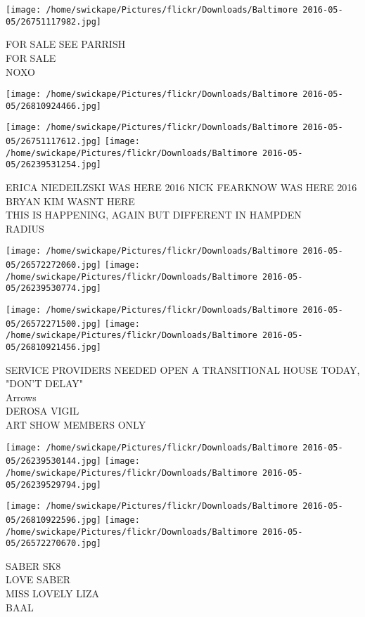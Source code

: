 \documentclass[10pt,letterpaper]{article}
\begin{document}
\texttt{[image: /home/swickape/Pictures/flickr/Downloads/Baltimore 2016-05-05/26751117982.jpg]}

FOR SALE SEE PARRISH\\
FOR SALE\\
NOXO
\pagebreak

\texttt{[image: /home/swickape/Pictures/flickr/Downloads/Baltimore 2016-05-05/26810924466.jpg]}

\vspace{0.25in}
\texttt{[image: /home/swickape/Pictures/flickr/Downloads/Baltimore 2016-05-05/26751117612.jpg]}
\texttt{[image: /home/swickape/Pictures/flickr/Downloads/Baltimore 2016-05-05/26239531254.jpg]}

ERICA NIEDEILZSKI WAS HERE 2016 NICK FEARKNOW WAS HERE 2016 BRYAN KIM WASNT HERE\\
THIS IS HAPPENING, AGAIN BUT DIFFERENT IN HAMPDEN\\
RADIUS
\pagebreak

\texttt{[image: /home/swickape/Pictures/flickr/Downloads/Baltimore 2016-05-05/26572272060.jpg]}
\texttt{[image: /home/swickape/Pictures/flickr/Downloads/Baltimore 2016-05-05/26239530774.jpg]}

\texttt{[image: /home/swickape/Pictures/flickr/Downloads/Baltimore 2016-05-05/26572271500.jpg]}
\texttt{[image: /home/swickape/Pictures/flickr/Downloads/Baltimore 2016-05-05/26810921456.jpg]}

SERVICE PROVIDERS NEEDED OPEN A TRANSITIONAL HOUSE TODAY, "DON'T DELAY"\\
Arrows\\
DEROSA VIGIL\\
ART SHOW MEMBERS ONLY
\pagebreak

\texttt{[image: /home/swickape/Pictures/flickr/Downloads/Baltimore 2016-05-05/26239530144.jpg]}
\texttt{[image: /home/swickape/Pictures/flickr/Downloads/Baltimore 2016-05-05/26239529794.jpg]}

\texttt{[image: /home/swickape/Pictures/flickr/Downloads/Baltimore 2016-05-05/26810922596.jpg]}
\texttt{[image: /home/swickape/Pictures/flickr/Downloads/Baltimore 2016-05-05/26572270670.jpg]}

SABER SK8\\
LOVE SABER\\
MISS LOVELY LIZA\\
BAAL
\pagebreak
\end{document}
